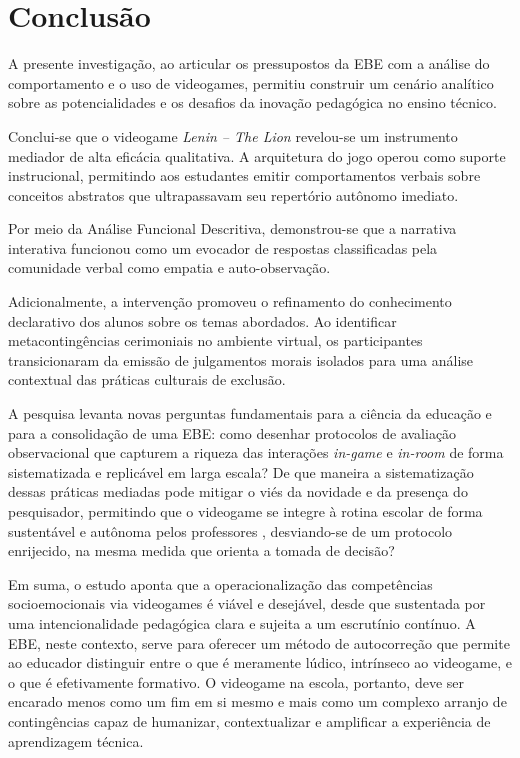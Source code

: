 \documentclass[portuguese]{textolivre}
\begin{document}
\section{Conclusão}
A presente investigação, ao articular os pressupostos da EBE com a análise do comportamento e o uso de videogames, permitiu construir um cenário analítico sobre as potencialidades e os desafios da inovação pedagógica no ensino técnico.

Conclui-se que o videogame \textit{Lenin – The Lion} \cite{bueno2019lenin} revelou-se um instrumento mediador de alta eficácia qualitativa. A arquitetura do jogo operou como suporte instrucional, permitindo aos estudantes emitir comportamentos verbais sobre conceitos abstratos que ultrapassavam seu repertório autônomo imediato.

Por meio da Análise Funcional Descritiva, demonstrou-se que a narrativa interativa funcionou como um evocador de respostas classificadas pela comunidade verbal como empatia e auto-observação.

Adicionalmente, a intervenção promoveu o refinamento do conhecimento declarativo dos alunos sobre os temas abordados. Ao identificar metacontingências cerimoniais no ambiente virtual, os participantes transicionaram da emissão de julgamentos morais isolados para uma análise contextual das práticas culturais de exclusão.

A pesquisa levanta novas perguntas fundamentais para a ciência da educação e para a consolidação de uma EBE: como desenhar protocolos de avaliação observacional que capturem a riqueza das interações \textit{in-game} e \textit{in-room} \cite{lieberoth2015mixed} de forma sistematizada e replicável em larga escala? De que maneira a sistematização dessas práticas mediadas pode mitigar o viés da novidade e da presença do pesquisador, permitindo que o videogame se integre à rotina escolar de forma sustentável e autônoma pelos professores \cite{slavin1996education}, desviando-se de um protocolo enrijecido, na mesma medida que orienta a tomada de decisão?

Em suma, o estudo aponta que a operacionalização das competências socioemocionais via videogames é viável e desejável, desde que sustentada por uma intencionalidade pedagógica clara e sujeita a um escrutínio contínuo. A EBE, neste contexto, serve para oferecer um método de autocorreção que permite ao educador distinguir entre o que é meramente lúdico, intrínseco ao videogame, e o que é efetivamente formativo. O videogame na escola, portanto, deve ser encarado menos como um fim em si mesmo e mais como um complexo arranjo de contingências capaz de humanizar, contextualizar e amplificar a experiência de aprendizagem técnica.
\end{document}
